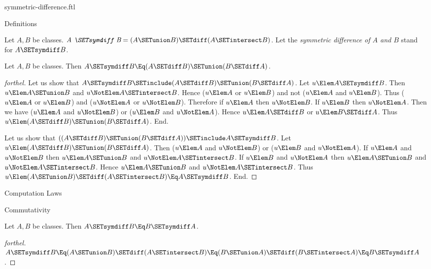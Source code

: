\documentclass{stex}
\begin{document}
\begin{smodule}{symmetric-difference.ftl}

\begin{sfragment}{Definitions}
  \begin{definition}[forthel]
    Let $A, B$ be classes.
    $\emph{A \SETsymdiff B} = (A \SETunion B) \SETdiff (A \SETintersect B)$.
    Let the \emph{symmetric difference of $A$ and $B$} stand for $A \SETsymdiff B$.
  \end{definition}

  \begin{proposition}[forthel]
    Let $A, B$ be classes.
    Then $A \SETsymdiff B \Eq (A \SETdiff B) \SETunion (B \SETdiff A)$.
  \end{proposition}
  \begin{proof}[forthel]
    Let us show that $A \SETsymdiff B \SETinclude (A \SETdiff B) \SETunion (B \SETdiff A)$.
      Let $u \Elem A \SETsymdiff B$.
      Then $u \Elem A \SETunion B$ and $u \NotElem A \SETintersect B$.
      Hence ($u \Elem A$ or $u \Elem B$) and not ($u \Elem A$ and $u \Elem B$).
      Thus ($u \Elem A$ or $u \Elem B$) and ($u \NotElem A$ or $u \NotElem B$).
      Therefore if $u \Elem A$ then $u \NotElem B$.
      If $u \Elem B$ then $u \NotElem A$.
      Then we have ($u \Elem A$ and $u \NotElem B$) or ($u \Elem B$ and $u \NotElem A$).
      Hence $u \Elem A \SETdiff B$ or $u \Elem B \SETdiff A$.
      Thus $u \Elem (A \SETdiff B) \SETunion (B \SETdiff A)$.
    End.

    Let us show that $((A \SETdiff B) \SETunion (B \SETdiff A)) \SETinclude A \SETsymdiff B$. %
      Let $u \Elem (A \SETdiff B) \SETunion (B \SETdiff A)$.
      Then ($u \Elem A$ and $u \NotElem B$) or ($u \Elem B$ and $u \NotElem A$).
      If $u \Elem A$ and $u \NotElem B$ then $u \Elem A \SETunion B$ and $u \NotElem A \SETintersect B$.
      If $u \Elem B$ and $u \NotElem A$ then $u \Elem A \SETunion B$ and $u \NotElem A \SETintersect B$.
      Hence $u \Elem A \SETunion B$ and $u \NotElem A \SETintersect B$.
      Thus $u \Elem (A \SETunion B) \SETdiff (A \SETintersect B) \Eq A \SETsymdiff B$.
    End.
  \end{proof}
\end{sfragment}

\begin{sfragment}{Computation Laws}
  \begin{sfragment}{Commutativity}
    \begin{proposition}[forthel]
      Let $A, B$ be classes.
      Then $A \SETsymdiff B \Eq B \SETsymdiff A$.
    \end{proposition}
    \begin{proof}[forthel]
      $A \SETsymdiff B
        \Eq (A \SETunion B) \SETdiff (A \SETintersect B)
        \Eq (B \SETunion A) \SETdiff (B \SETintersect A)
        \Eq B \SETsymdiff A$.
    \end{proof}
  \end{sfragment}


\end{sfragment}
\end{smodule}
\end{document}
